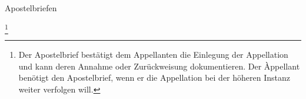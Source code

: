 \documentclass{book}
\begin{document}
Apostelbriefen
    
    \footnote{Der Apostelbrief bestätigt dem Appellanten die Einlegung der Appellation
    und kann deren Annahme oder Zurückweisung dokumentieren. Der Àppellant benötigt den
    Apostelbrief, wenn er die Appellation bei der höheren Instanz weiter verfolgen will.}
\end{document}
